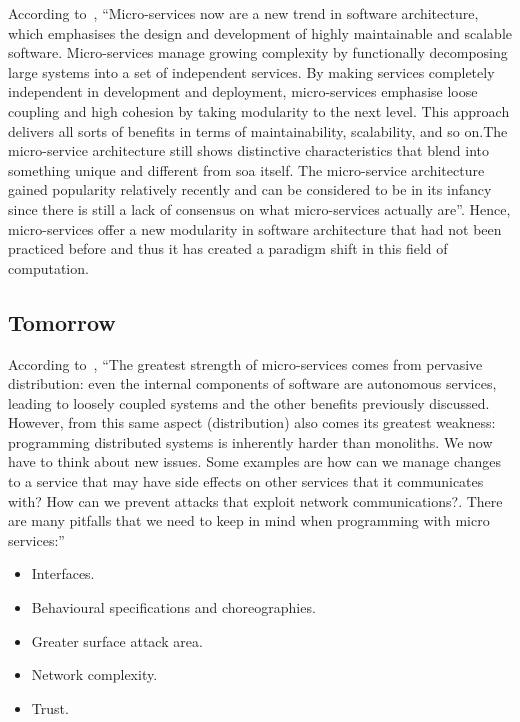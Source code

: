 According to~\cite{microservicesStateOfArt}, \enquote{Micro-services now are a new trend in software architecture, which emphasises the design and development of highly maintainable and scalable software. Micro-services manage growing complexity by functionally decomposing large systems into a set of independent services. By making services completely independent in development and deployment, micro-services emphasise loose coupling and high cohesion by taking modularity to the next level. This approach delivers all sorts of benefits in terms of maintainability, scalability, and so on.The micro-service architecture still shows distinctive characteristics that blend into something unique and different from \gls{soa} itself. The micro-service architecture gained popularity relatively recently and can be considered to be in its infancy since there is still a lack of consensus on what micro-services actually are}. Hence, micro-services offer a new modularity in software architecture that had not been practiced before and thus it has created a paradigm shift in this field of computation.

\subsection{Tomorrow}

According to~\cite{microservicesStateOfArt}, \enquote{The greatest strength of micro-services comes from pervasive distribution: even the internal components of software are autonomous services, leading to loosely coupled systems and the other benefits previously discussed. However, from this same aspect (distribution) also comes its greatest weakness: programming distributed systems is inherently harder than monoliths. We now have to think about new issues. Some examples are how can we manage changes to a service that may have side effects on other services that it communicates with? How can we prevent attacks that exploit network communications?. There are many pitfalls that we need to keep in mind when programming with micro services:}
\begin{itemize}
    \item Interfaces.
    \item Behavioural specifications and choreographies.
    \item Greater surface attack area.
    \item Network complexity.
    \item Trust.
\end{itemize}
